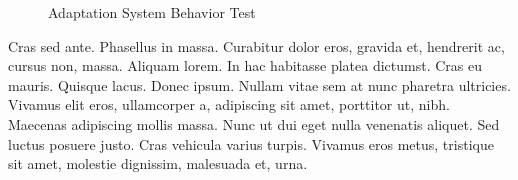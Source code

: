 \begin{figure}[h]
        \caption{Adaptation System Behavior Test}
        \label{fig:fig:adapt_behave_2}
\end{figure}

Cras sed ante. Phasellus in massa. Curabitur dolor eros, gravida et, hendrerit ac, cursus non, massa. Aliquam lorem. In hac habitasse platea dictumst. Cras eu mauris. Quisque lacus. Donec ipsum. Nullam vitae sem at nunc pharetra ultricies. Vivamus elit eros, ullamcorper a, adipiscing sit amet, porttitor ut, nibh. Maecenas adipiscing mollis massa. Nunc ut dui eget nulla venenatis aliquet. Sed luctus posuere justo. Cras vehicula varius turpis. Vivamus eros metus, tristique sit amet, molestie dignissim, malesuada et, urna.